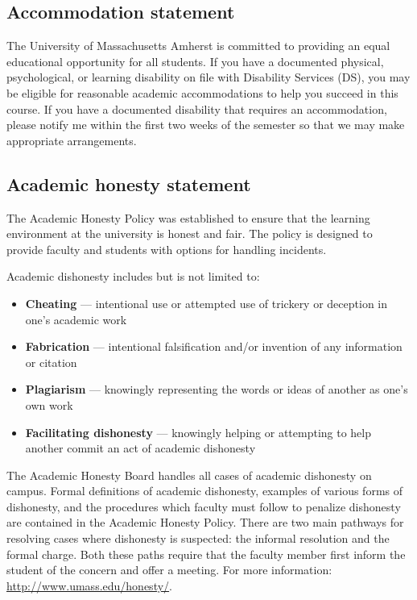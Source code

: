 \documentclass[11pt]{article}
\begin{document}
\subsection{Accommodation statement}
\label{sec:org83131ed}

The University of Massachusetts Amherst is committed to providing an equal
educational opportunity for all students. If you have a documented physical,
psychological, or learning disability on file with Disability Services (DS),
you may be eligible for reasonable academic accommodations to help you succeed
in this course. If you have a documented disability that requires an
accommodation, please notify me within the first two weeks of the semester so
that we may make appropriate arrangements.

\subsection{Academic honesty statement}
\label{sec:org8c5c59f}

The Academic Honesty Policy was established to ensure that the learning
environment at the university is honest and fair. The policy is designed to
provide faculty and students with options for handling incidents.

Academic dishonesty includes but is not limited to:

\begin{itemize}
\item \textbf{Cheating} — intentional use or attempted use of trickery or deception in one’s academic work
\item \textbf{Fabrication} — intentional falsification and/or invention of any information or citation
\item \textbf{Plagiarism} — knowingly representing the words or ideas of another as one’s own work
\item \textbf{Facilitating dishonesty} — knowingly helping or attempting to help another commit an act of academic dishonesty
\end{itemize}

The Academic Honesty Board handles all cases of academic dishonesty on campus.
Formal definitions of academic dishonesty, examples of various forms of
dishonesty, and the procedures which faculty must follow to penalize dishonesty
are contained in the Academic Honesty Policy. There are two main pathways for
resolving cases where dishonesty is suspected: the informal resolution and the
formal charge. Both these paths require that the faculty member first inform
the student of the concern and offer a meeting. For more information:
\url{http://www.umass.edu/honesty/}.
\end{document}

